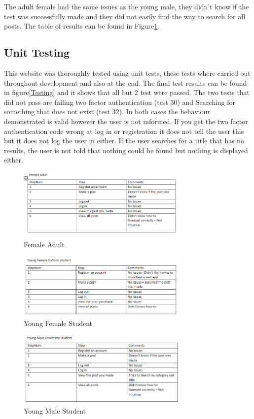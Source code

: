 \documentclass{cmpstyle}
\begin{document}
The adult female had the same issues as the young male, they didn't know if the test was successfully made and they did not easily find the way to search for all posts. The table of results can be found in Figure\ref{Female}.
\subsection{Unit Testing}
This website was thoroughly tested using unit tests, these tests where carried out throughout development and also at the end. The final test results can be found in figure\ref{Testing} and it shows that all but 2 test were passed. The two tests that did not pass are failing two factor authentication (test 30) and Searching for something that does not exist (test 32). In both cases the behaviour demonstrated is valid however the user is not informed. If you get the two factor authentication code wrong at log in or registration it does not tell the user this but it does not log the user in either. If the user searches for a title that has no results, the user is not told that nothing could be found but nothing is displayed either.
\clearpage
\appendix
\begin{figure}[htb]
	\centering
	\includegraphics[width=0.75\textwidth]{Female.png}
	\caption{Female Adult \label{Female}}
\end{figure}
\begin{figure}[htb]
	\centering
	\includegraphics[width=0.75\textwidth]{Young female.png}
	\caption{Young Female Student \label{YFemale}}
\end{figure}
\begin{figure}[htb]
	\centering
	\includegraphics[width=0.75\textwidth]{Young male.png}
	\caption{Young Male Student \label{YMale}}
\end{figure}
\end{document}
